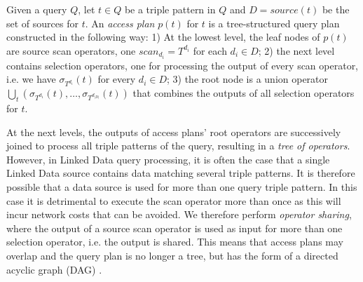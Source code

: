 \begin{definition}
  Given a query $Q$, let $t \in Q$ be a triple pattern in $Q$ and $D =
  source(t)$ be the set of sources for $t$. An \emph{access plan}
  $p(t)$ for $t$ is a tree-structured query plan constructed in the
  following way: 1) At the lowest level, the leaf nodes of $p(t)$ are
  source scan operators, one $scan_{d_i} = T^{d_i}$ for each $d_i \in
  D$; 2) the next level contains selection operators, one for
  processing the output of every scan operator, i.e. we have
  $\sigma_{T^{d_i}}(t)$ for every $d_i \in D$; 3) the root node is a
  union operator
  $\bigcup_t(\sigma_{T^{d_1}}(t),\ldots,\sigma_{T^{d_{|D|}}}(t))$ that
  combines the outputs of all selection operators for $t$.

\end{definition}

At the next levels, the outputs of access plans' root operators are
successively joined to process all triple patterns of the query,
resulting in a \emph{tree of operators}. However, in Linked Data query
processing, it is often the case that a single Linked Data source
contains data matching several triple patterns. It is therefore
possible that a data source is used for more than one query triple
pattern. In this case it is detrimental to execute the scan operator
more than once as this will incur network costs that can be
avoided. We therefore perform \emph{operator sharing}, where the
output of a source scan operator is used as input for more than one
selection operator, i.e. the output is shared. This means that access
plans may overlap and the query plan is no longer a tree, but
has the form of a directed acyclic graph (DAG) \cite{Neumann_2005}.

